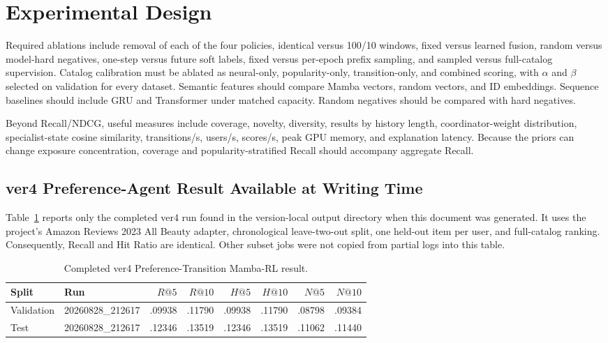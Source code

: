 \documentclass[11pt,a4paper]{article}
\begin{document}
\section{Experimental Design}

Required ablations include removal of each of the four policies, identical
versus 100/10 windows, fixed versus learned fusion, random versus model-hard
negatives, one-step versus future soft labels, fixed versus per-epoch prefix
sampling, and sampled versus full-catalog supervision.
Catalog calibration must be ablated as neural-only, popularity-only,
transition-only, and combined scoring, with $\alpha$ and $\beta$ selected on
validation for every dataset. Semantic features should compare Mamba vectors,
random vectors, and ID embeddings. Sequence baselines should include GRU and
Transformer under matched capacity. Random negatives should be compared with
hard negatives.

Beyond Recall/NDCG, useful measures include coverage, novelty, diversity,
results by history length, coordinator-weight distribution, specialist-state
cosine similarity, transitions/s, users/s, scores/s, peak GPU memory, and
explanation latency. Because the priors can change exposure concentration,
coverage and popularity-stratified Recall should accompany aggregate Recall.

\subsection{ver4 Preference-Agent Result Available at Writing Time}

Table~\ref{tab:ver4-current} reports only the completed ver4 run found in the
version-local output directory when this document was generated. It uses the
project's Amazon Reviews 2023 All Beauty adapter, chronological leave-two-out
split, one held-out item per user, and full-catalog ranking. Consequently,
Recall and Hit Ratio are identical. Other subset jobs were not copied from
partial logs into this table.

\begin{table}[H]
\centering
\caption{Completed ver4 Preference-Transition Mamba-RL result.}
\label{tab:ver4-current}
\footnotesize
\begin{tabular}{@{}llrrrrrr@{}}
\toprule
Split & Run & $R@5$ & $R@10$ & $H@5$ & $H@10$ & $N@5$ & $N@10$\\
\midrule
Validation & 20260828\_212617 & .09938 & .11790 & .09938 & .11790 & .08798 & .09384\\
Test & 20260828\_212617 & .12346 & .13519 & .12346 & .13519 & .11062 & .11440\\
\bottomrule
\end{tabular}
\end{table}
\end{document}
